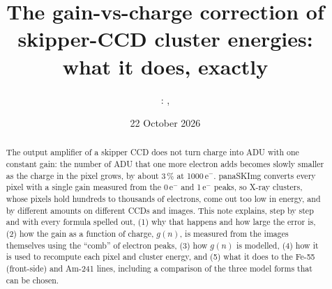 \documentclass[11pt,a4paper]{article}
\title{The gain-vs-charge correction of skipper-CCD cluster energies:\\ what it does, exactly}
\author{\code{comm\_scripts}: \code{src/gain\_vs\_charge.py}, \code{bin/run\_WADERs --gain-correction}}
\date{22 October 2026}
\newcommand{\eminus}{e$^-$}
\begin{document}
\maketitle

\begin{abstract}
The output amplifier of a skipper CCD does not turn charge into ADU with one constant gain: the
number of ADU that one more electron adds becomes slowly smaller as the charge in the pixel grows,
by about 3\,\% at 1000\,\eminus. panaSKImg converts every pixel with a single gain measured from
the 0\,\eminus{} and 1\,\eminus{} peaks, so X-ray clusters, whose pixels hold hundreds to thousands of
electrons, come out too low in energy, and by different amounts on different CCDs and images. This
note explains, step by step and with every formula spelled out, (1) why that happens and how large
the error is, (2) how the gain as a function of charge, $g(n)$, is measured from the images
themselves using the ``comb'' of electron peaks, (3) how $g(n)$ is modelled, (4) how it is used to
recompute each pixel and cluster energy, and (5) what it does to the Fe-55 (front-side) and Am-241
lines, including a comparison of the three model forms that can be chosen.
\end{abstract}

\tableofcontents
\end{document}
